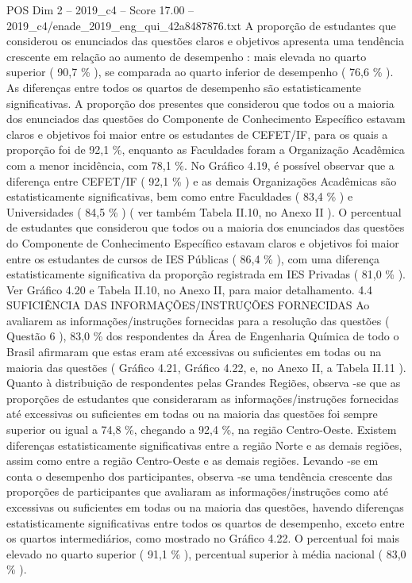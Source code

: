 \begin{textsample}{POS Dim 2 – 2019\_c4 – Score 17.00 – 2019\_c4/enade\_2019\_eng\_qui\_42a8487876.txt}
A proporção de estudantes que considerou os enunciados das questões claros e objetivos apresenta uma tendência crescente em relação ao aumento de desempenho : mais elevada no quarto superior ( 90,7 \% ), se comparada ao quarto inferior de desempenho ( 76,6 \% ).
As diferenças entre todos os quartos de desempenho são estatisticamente significativas.
A proporção dos presentes que considerou que todos ou a maioria dos enunciados das questões do Componente de Conhecimento Específico estavam claros e objetivos foi maior entre os estudantes de CEFET/IF, para os quais a proporção foi de 92,1 \%, enquanto as Faculdades foram a Organização Acadêmica com a menor incidência, com 78,1 \%.
No Gráfico 4.19, é possível observar que a diferença entre CEFET/IF ( 92,1 \% ) e as demais Organizações Acadêmicas são estatisticamente significativas, bem como entre Faculdades ( 83,4 \% ) e Universidades ( 84,5 \% ) ( ver também Tabela II.10, no Anexo II ).
O percentual de estudantes que considerou que todos ou a maioria dos enunciados das questões do Componente de Conhecimento Específico estavam claros e objetivos foi maior entre os estudantes de cursos de IES Públicas ( 86,4 \% ), com uma diferença estatisticamente significativa da proporção registrada em IES Privadas ( 81,0 \% ).
Ver Gráfico 4.20 e Tabela II.10, no Anexo II, para maior detalhamento. 4.4 SUFICIÊNCIA DAS INFORMAÇÕES/INSTRUÇÕES FORNECIDAS Ao avaliarem as informações/instruções fornecidas para a resolução das questões ( Questão 6 ), 83,0 \% dos respondentes da Área de Engenharia Química de todo o Brasil afirmaram que estas eram até excessivas ou suficientes em todas ou na maioria das questões ( Gráfico 4.21, Gráfico 4.22, e, no Anexo II, a Tabela II.11 ).
Quanto à distribuição de respondentes pelas Grandes Regiões, observa -se que as proporções de estudantes que consideraram as informações/instruções fornecidas até excessivas ou suficientes em todas ou na maioria das questões foi sempre superior ou igual a 74,8 \%, chegando a 92,4 \%, na região Centro-Oeste.
Existem diferenças estatisticamente significativas entre a região Norte e as demais regiões, assim como entre a região Centro-Oeste e as demais regiões.
Levando -se em conta o desempenho dos participantes, observa -se uma tendência crescente das proporções de participantes que avaliaram as informações/instruções como até excessivas ou suficientes em todas ou na maioria das questões, havendo diferenças estatisticamente significativas entre todos os quartos de desempenho, exceto entre os quartos intermediários, como mostrado no Gráfico 4.22.
O percentual foi mais elevado no quarto superior ( 91,1 \% ), percentual superior à média nacional ( 83,0 \% ).

\end{textsample}
